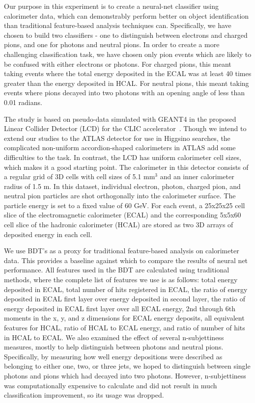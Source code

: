 Our purpose in this experiment is to create a neural-net classifier using calorimeter data, which can demonstrably perform better on object identification than traditional feature-based analysis techniques can. Specifically, we have chosen to build two classifiers - one to distinguish between electrons and charged pions, and one for photons and neutral pions. In order to create a more challenging classification task, we have chosen only pion events which are likely to be confused with either electrons or photons. For charged pions, this meant taking events where the total energy deposited in the ECAL was at least 40 times greater than the energy deposited in HCAL. For neutral pions, this meant taking events where pions decayed into two photons with an opening angle of less than 0.01 radians.

The study is based on pseudo-data simulated with GEANT4 in the proposed Linear Collider Detector (LCD) for the CLIC accelerator~\cite{Lebrun}. Though we intend to extend our studies to the ATLAS detector for use in Higgsino searches, the complicated non-uniform accordion-shaped calorimeters in ATLAS add some difficulties to the task. In contrast, the LCD has uniform calorimeter cell sizes, which makes it a good starting point. The calorimeter in this detector consists of a regular grid of 3D cells with cell sizes of 5.1 mm$^3$ and an inner calorimeter radius of 1.5 m. In this dataset, individual electron, photon, charged pion, and neutral pion particles are shot orthogonally into the calorimeter surface. The particle energy is set to a fixed value of 60 GeV. For each event, a 25x25x25 cell slice of the electromagnetic calorimeter (ECAL) and the corresponding 5x5x60 cell slice of the hadronic calorimeter (HCAL) are stored as two 3D arrays of deposited energy in each cell.

We use BDT's as a proxy for traditional feature-based analysis on calorimeter data. This provides a baseline against which to compare the results of neural net performance. All features used in the BDT are calculated using traditional methods, where the complete list of features we use is as follows: total energy deposited in ECAL, total number of hits registered in ECAL, the ratio of energy deposited in ECAL first layer over energy deposited in second layer, the ratio of energy deposited in ECAL first layer over all ECAL energy, 2nd through 6th moments in the x, y, and z dimensions for ECAL energy deposits, all equivalent features for HCAL, ratio of HCAL to ECAL energy, and ratio of number of hits in HCAL to ECAL. We also examined the effect of several n-subjettiness measures, mostly to help distinguish between photons and neutral pions. Specifically, by measuring how well energy depositions were described as belonging to either one, two, or three jets, we hoped to distinguish between single photons and pions which had decayed into two photons. However, n-subjettiness was computationally expensive to calculate and did not result in much classification improvement, so its usage was dropped.


